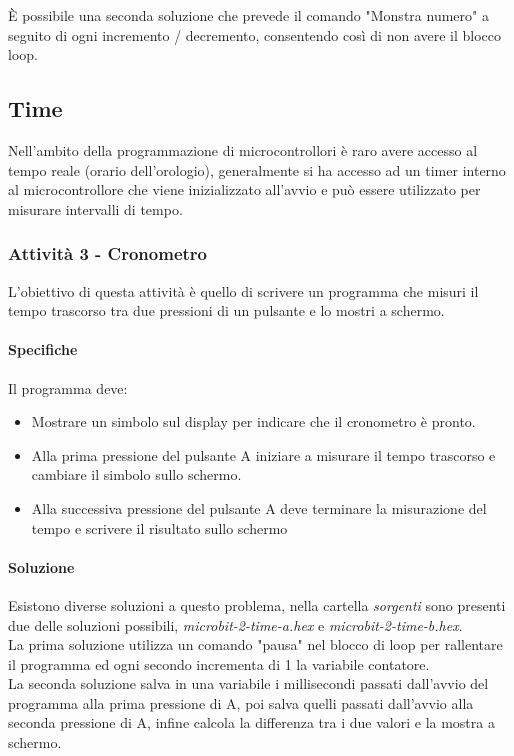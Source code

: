 \documentclass[../../docenti.tex]{subfiles}
\begin{document}
È possibile una seconda soluzione che prevede il comando "Monstra numero" a seguito di ogni incremento / decremento, consentendo così di non avere il blocco loop.
\newpage
\subsection{Time}
Nell'ambito della programmazione di microcontrollori è raro avere accesso al tempo reale (orario dell'orologio), generalmente si ha accesso ad un timer interno al microcontrollore che viene inizializzato all'avvio e può essere utilizzato per misurare intervalli di tempo.

\subsubsection{Attività 3 - Cronometro}
L'obiettivo di questa attività è quello di scrivere un programma che misuri il tempo trascorso tra due pressioni di un pulsante e lo mostri a schermo.

\paragraph{Specifiche} Il programma deve:
\begin{itemize}
	\item Mostrare un simbolo sul display per indicare che il cronometro è pronto.
	\item Alla prima pressione del pulsante A iniziare a misurare il tempo trascorso e cambiare il simbolo sullo schermo.
	\item Alla successiva pressione del pulsante A deve terminare la misurazione del tempo e scrivere il risultato sullo schermo
\end{itemize}

\paragraph{Soluzione}
Esistono diverse soluzioni a questo problema, nella cartella \textit{sorgenti} sono presenti due delle soluzioni possibili,  \textit{microbit-2-time-a.hex} e \textit{microbit-2-time-b.hex}.\\
La prima soluzione utilizza un comando "pausa" nel blocco di loop per rallentare il programma ed ogni secondo incrementa di 1 la variabile contatore.\\
La seconda soluzione salva in una variabile i millisecondi passati dall'avvio del programma alla prima pressione di A, poi salva quelli passati dall'avvio alla seconda pressione di A, infine calcola la differenza tra i due valori e la mostra a schermo.
\end{document}
